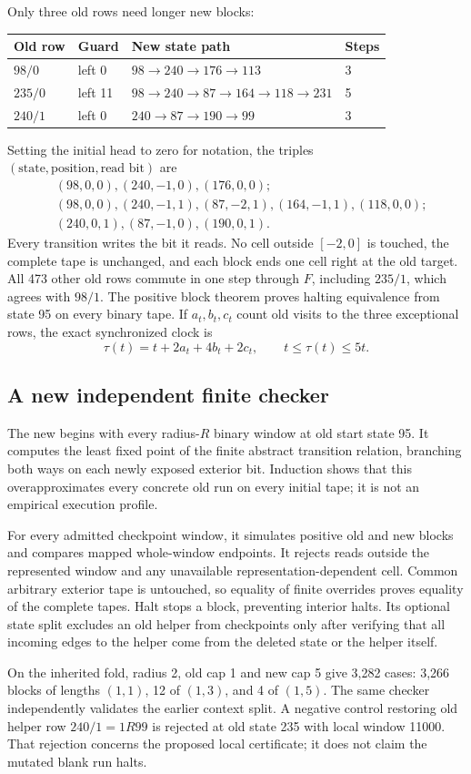 Only three old rows need longer new blocks:
\begin{center}\small
\begin{tabular}{@{}llll@{}}
\toprule
Old row & Guard & New state path & Steps\\
\midrule
$98/0$ & left 0 & $98\to240\to176\to113$ & 3\\
$235/0$ & left 11 & $98\to240\to87\to164\to118\to231$ & 5\\
$240/1$ & left 0 & $240\to87\to190\to99$ & 3\\
\bottomrule
\end{tabular}
\end{center}
Setting the initial head to zero for notation, the triples
$(\text{state},\text{position},\text{read bit})$ are
\begin{align*}
 &(98,0,0),(240,-1,0),(176,0,0);\\
 &(98,0,0),(240,-1,1),(87,-2,1),(164,-1,1),(118,0,0);\\
 &(240,0,1),(87,-1,0),(190,0,1).
\end{align*}
Every transition writes the bit it reads.  No cell outside $[-2,0]$
is touched, the complete tape is unchanged, and each block ends
one cell right at the old target.  All 473 other old rows commute
in one step through $F$, including $235/1$, which agrees with $98/1$.
The positive block theorem proves halting equivalence from state 95
on every binary tape.  If $a_t,b_t,c_t$ count old visits to the three
exceptional rows, the exact synchronized clock is
\[
             \tau(t)=t+2a_t+4b_t+2c_t,
             \qquad t\leq\tau(t)\leq5t.
\]

\subsection{A new independent finite checker}

The new  begins with
every radius-$R$ binary window at old start state 95.  It computes
the least fixed point of the finite abstract transition relation,
branching both ways on each newly exposed exterior bit.  Induction
shows that this overapproximates every concrete old run on every
initial tape; it is not an empirical execution profile.

For every admitted checkpoint window, it simulates positive old
and new blocks and compares mapped whole-window endpoints.  It
rejects reads outside the represented window and any unavailable
representation-dependent cell.  Common arbitrary exterior tape
is untouched, so equality of finite overrides proves equality of
the complete tapes.  Halt stops a block, preventing interior halts.
Its optional state split excludes an old helper from checkpoints
only after verifying that all incoming edges to the helper come
from the deleted state or the helper itself.

On the inherited fold, radius 2, old cap 1 and new cap 5 give
3,282 cases: 3,266 blocks of lengths $(1,1)$, 12 of $(1,3)$, and
4 of $(1,5)$.  The same checker independently validates the earlier
context split.  A negative control restoring old helper row
$240/1=1R99$ is rejected at old state 235 with local window 11000.
That rejection concerns the proposed local certificate; it does
not claim the mutated blank run halts.
